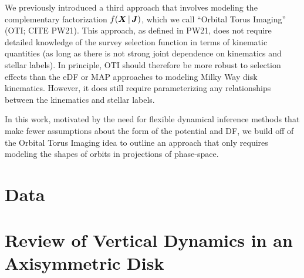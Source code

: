 We previously introduced a third approach that involves modeling the complementary
factorization $f(\boldsymbol{X} \,|\, \boldsymbol{J})$, which we call ``Orbital Torus Imaging'' (OTI;
CITE PW21).
This approach, as defined in PW21, does not require detailed knowledge of the survey
selection function in terms of kinematic quantities (as long as there is not strong
joint dependence on kinematics and stellar labels).
In principle, OTI should therefore be more robust to selection effects than the eDF or
MAP approaches to modeling Milky Way disk kinematics.
However, it does still require parameterizing any relationships between the kinematics
and stellar labels.

In this work, motivated by the need for flexible dynamical inference methods that make
fewer assumptions about the form of the potential and DF, we build off of the Orbital
Torus Imaging idea to outline an approach that only requires modeling the shapes of
orbits in projections of phase-space.


\section{Data} \label{sec:data}



\section{Review of Vertical Dynamics in an Axisymmetric Disk} \label{sec:dynreview}


